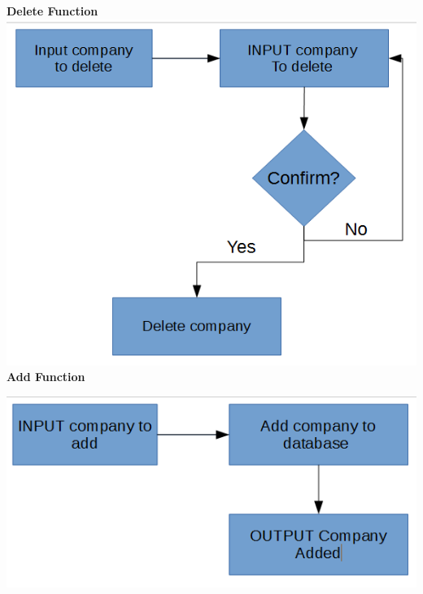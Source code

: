 \begin{flushleft}
\textbf{Delete Function}\\
\includegraphics[scale=0.7]{FC3.jpg}\\
\textbf{Add Function}\\\par
\includegraphics[scale=0.7]{FC4.jpg}\\
\end{flushleft}
\clearpage

